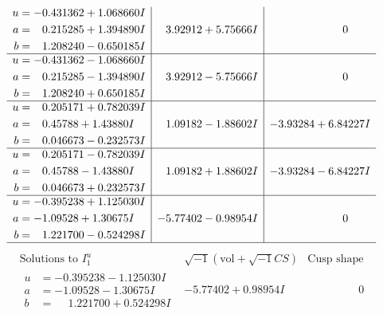 \documentclass[1p]{elsarticle_modified}
\theoremstyle{definition}
\newcommand{\I}{\sqrt{-1}}
\begin{document}
$$\begin{array}{c|c|c}
\begin{aligned}
u &= -0.431362 + 1.068660 I \\
a &= \phantom{-}0.215285 + 1.394890 I \\
b &= \phantom{-}1.208240 - 0.650185 I\end{aligned}
 & \phantom{-}3.92912 + 5.75666 I & \phantom{-0.000000 } 0 \\ \hline\begin{aligned}
u &= -0.431362 - 1.068660 I \\
a &= \phantom{-}0.215285 - 1.394890 I \\
b &= \phantom{-}1.208240 + 0.650185 I\end{aligned}
 & \phantom{-}3.92912 - 5.75666 I & \phantom{-0.000000 } 0 \\ \hline\begin{aligned}
u &= \phantom{-}0.205171 + 0.782039 I \\
a &= \phantom{-}0.45788 + 1.43880 I \\
b &= \phantom{-}0.046673 - 0.232573 I\end{aligned}
 & \phantom{-}1.09182 - 1.88602 I & -3.93284 + 6.84227 I \\ \hline\begin{aligned}
u &= \phantom{-}0.205171 - 0.782039 I \\
a &= \phantom{-}0.45788 - 1.43880 I \\
b &= \phantom{-}0.046673 + 0.232573 I\end{aligned}
 & \phantom{-}1.09182 + 1.88602 I & -3.93284 - 6.84227 I \\ \hline\begin{aligned}
u &= -0.395238 + 1.125030 I \\
a &= -1.09528 + 1.30675 I \\
b &= \phantom{-}1.221700 - 0.524298 I\end{aligned}
 & -5.77402 - 0.98954 I & \phantom{-0.000000 } 0\\
 \hline 
 \end{array}$$\newpage$$\begin{array}{c|c|c}  
\text{Solutions to }I^u_{1}& \I (\text{vol} + \sqrt{-1}CS) & \text{Cusp shape}\\
 \hline 
\begin{aligned}
u &= -0.395238 - 1.125030 I \\
a &= -1.09528 - 1.30675 I \\
b &= \phantom{-}1.221700 + 0.524298 I\end{aligned}
 & -5.77402 + 0.98954 I & \phantom{-0.000000 } 0 \\ \hline\begin{aligned}

\end{aligned}
\end{array}$$
\end{document}
